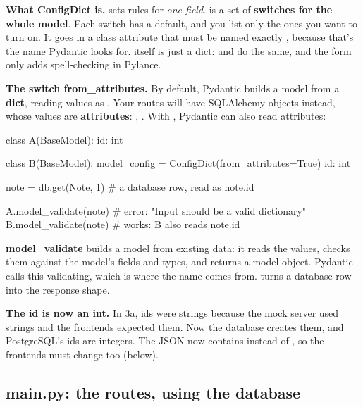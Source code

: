 \textbf{What ConfigDict is.}  sets rules for \emph{one field}.  is a set of \textbf{switches for the whole model}. Each switch has a default, and you list only the ones you want to turn on. It goes in a class attribute that must be named exactly , because that's the name Pydantic looks for.  itself is just a dict:  and  do the same, and the  form only adds spell-checking in Pylance.

\textbf{The switch from\_attributes.} By default, Pydantic builds a model from a \textbf{dict}, reading values as . Your routes will have SQLAlchemy objects instead, whose values are \textbf{attributes}: , . With , Pydantic can also read attributes:

\begin{py}
class A(BaseModel):
	id: int

class B(BaseModel):
	model_config = ConfigDict(from_attributes=True)
	id: int

note = db.get(Note, 1)      # a database row, read as note.id

A.model_validate(note)      # error: "Input should be a valid dictionary"
B.model_validate(note)      # works: B also reads note.id
\end{py}

\textbf{model\_validate} builds a model from existing data: it reads the values, checks them against the model's fields and types, and returns a model object. Pydantic calls this validating, which is where the name comes from.  turns a database row into the response shape.

\textbf{The id is now an int.} In 3a, ids were strings because the mock server used strings and the frontends expected them. Now the database creates them, and PostgreSQL's ids are integers. The JSON now contains  instead of , so the frontends must change too (below).

\subsection{main.py: the routes, using the database}

